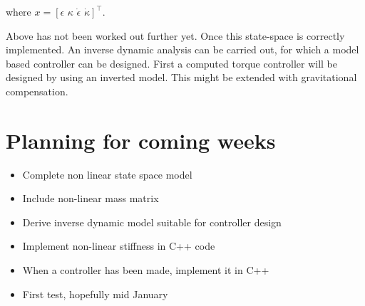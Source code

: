 where $x = [\epsilon \hspace{4pt} \kappa \hspace{4pt} \dot{\epsilon} \hspace{4pt} \dot{\kappa}]^\top$.

Above has not been worked out further yet. Once this state-space is correctly implemented. An inverse dynamic analysis can be carried out, for which a model based controller can be designed. First a computed torque controller will be designed by using an inverted model. This might be extended with gravitational compensation.



\section{Planning for coming weeks}


\begin{itemize}
    \item Complete non linear state space model
    \item Include non-linear mass matrix
    \item Derive inverse dynamic model suitable for controller design
    \item Implement non-linear stiffness in C++ code
    \item When a controller has been made, implement it in C++
    \item First test, hopefully mid January
\end{itemize}